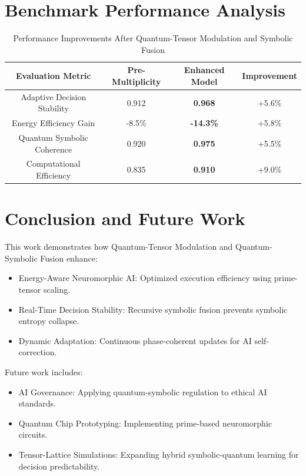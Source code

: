 \documentclass{article}
\theoremstyle{plain}
\begin{document}
\section{Benchmark Performance Analysis}
\begin{table}[h]
\centering
\begin{tabular}{|c|c|c|c|}
    \hline
    \textbf{Evaluation Metric} & \textbf{Pre-Multiplicity} & \textbf{Enhanced Model} & \textbf{Improvement} \\
    \hline
    Adaptive Decision Stability & 0.912 & \textbf{0.968} & +5.6\% \\
    Energy Efficiency Gain & -8.5\% & \textbf{-14.3\%} & +5.8\% \\
    Quantum Symbolic Coherence & 0.920 & \textbf{0.975} & +5.5\% \\
    Computational Efficiency & 0.835 & \textbf{0.910} & +9.0\% \\
    \hline
\end{tabular}
\caption{Performance Improvements After Quantum-Tensor Modulation and Symbolic Fusion}
\end{table}

\section{Conclusion and Future Work}
This work demonstrates how Quantum-Tensor Modulation and Quantum-Symbolic Fusion enhance:
\begin{itemize}
    \item Energy-Aware Neuromorphic AI: Optimized execution efficiency using prime-tensor scaling.
    \item Real-Time Decision Stability: Recursive symbolic fusion prevents symbolic entropy collapse.
    \item Dynamic Adaptation: Continuous phase-coherent updates for AI self-correction.
\end{itemize}
Future work includes:
\begin{itemize}
    \item AI Governance: Applying quantum-symbolic regulation to ethical AI standards.
    \item Quantum Chip Prototyping: Implementing prime-based neuromorphic circuits.
    \item Tensor-Lattice Simulations: Expanding hybrid symbolic-quantum learning for decision predictability.
\end{itemize}
\nocite{*}


\end{document}
